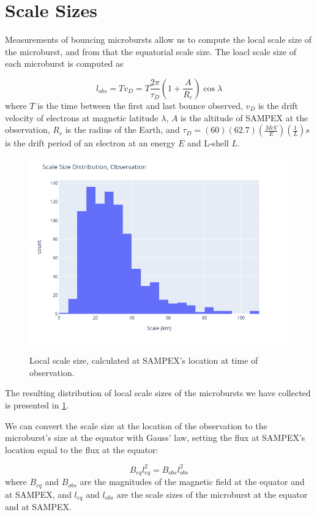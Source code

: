 \documentclass[draft]{agujournal2019}
\begin{document}
\section{Scale Sizes}
Measurements of bouncing microbursts allow us to compute the local scale size of the microburst, and from that the equatorial scale size. 
The loacl scale size of each microburst is computed as 

\begin{equation}
 l_{obs} = T v_D  = T \frac{2 \pi}{\tau_D} (1+ \frac{A}{R_e}) \cos \lambda 
\end{equation}
where $T$ is the time between the first and last bounce observed, $v_D$ is the drift velocity of electrons at magnetic latitude $\lambda$, $A$ is the altitude of SAMPEX at the observation, $R_e$ is the radius of the Earth, and $\tau_D= (60)(62.7)(\frac{MeV}{E})(\frac{1}{L})s$ is the drift period of an electron at an energy $E$ and L-shell $L$. 
\begin{figure}[h!]
 \includegraphics[width=\textwidth]{scale_hist_local.png}
 \label{fig:local}
 \caption{Local scale size, calculated at SAMPEX's location at time of observation.}
\end{figure}
The resulting distribution of local scale sizes of the microbursts we have collected is presented in \ref{fig:local}.

We can convert the scale size at the location of the observation to the microburst's size at the equator with Gauss' law, setting the flux at SAMPEX's location equal to the flux at the equator:

\begin{equation}
 B_{eq} l_{eq}^2 = B_{obs} l_{obs}^2
\end{equation}
where $B_{eq}$ and $B_{obs}$ are the magnitudes of the magnetic field at the equator and at SAMPEX, and $l_{eq}$ and $l_{obs}$ are the scale sizes of the microburst at the equator and at SAMPEX.
\end{document}

